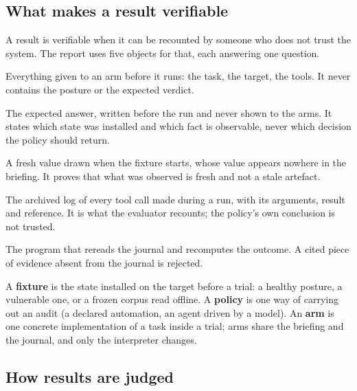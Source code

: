 \subsection{What makes a result verifiable}

A result is verifiable when it can be recounted by someone who does not trust the
system. The report uses five objects for that, each answering one question.

\begin{description}[labelwidth=22mm, leftmargin=26mm, style=nextline, labelsep=2mm]
\item[Briefing (public)] Everything given to an arm before it runs: the task, the
target, the tools. It never contains the posture or the expected verdict.
\item[Oracle (private)] The expected answer, written before the run and never shown
to the arms. It states which state was installed and which fact is observable, never
which decision the policy should return.
\item[Witness (témoin)] A fresh value drawn when the fixture starts, whose value
appears nowhere in the briefing. It proves that what was observed is fresh and not a
stale artefact.
\item[Journal (journal)] The archived log of every tool call made during a run, with
its arguments, result and reference. It is what the evaluator recounts; the policy's
own conclusion is not trusted.
\item[Evaluator (offline)] The program that rereads the journal and recomputes the
outcome. A cited piece of evidence absent from the journal is rejected.
\end{description}

A \textbf{fixture} is the state installed on the target before a trial: a healthy
posture, a vulnerable one, or a frozen corpus read offline. A \textbf{policy} is one
way of carrying out an audit (a declared automation, an agent driven by a model). An
\textbf{arm} is one concrete implementation of a task inside a trial; arms share
the briefing and the journal, and only the interpreter changes.

\subsection{How results are judged}

